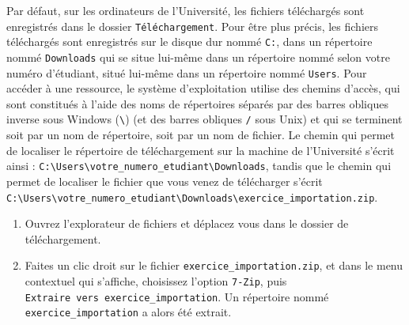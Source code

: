 \documentclass[
  11pt,
]{book}
\providecommand{\tightlist}{%
  \setlength{\itemsep}{0pt}\setlength{\parskip}{0pt}}
\numberwithin{equation}{section}
\numberwithin{countremarque}{section}
\newenvironment{greenbox}{
  \begin{tcolorbox}[breakable, colback=vert,coltext=black,
                  colframe=grisfonce]}
 {\end{tcolorbox}}
\begin{document}
Par défaut, sur les ordinateurs de l'Université, les fichiers téléchargés sont enregistrés dans le dossier \texttt{Téléchargement}. Pour être plus précis, les fichiers téléchargés sont enregistrés sur le disque dur nommé \texttt{C:}, dans un répertoire nommé \texttt{Downloads} qui se situe lui-même dans un répertoire nommé selon votre numéro d'étudiant, situé lui-même dans un répertoire nommé \texttt{Users}. Pour accéder à une ressource, le système d'exploitation utilise des chemins d'accès, qui sont constitués à l'aide des noms de répertoires séparés par des barres obliques inverse sous Windows (\texttt{\textbackslash{}}) (et des barres obliques \texttt{/} sous Unix) et qui se terminent soit par un nom de répertoire, soit par un nom de fichier. Le chemin qui permet de localiser le répertoire de téléchargement sur la machine de l'Université s'écrit ainsi : \texttt{C:\textbackslash{}Users\textbackslash{}votre\_numero\_etudiant\textbackslash{}Downloads}, tandis que le chemin qui permet de localiser le fichier que vous venez de télécharger s'écrit \texttt{C:\textbackslash{}Users\textbackslash{}votre\_numero\_etudiant\textbackslash{}Downloads\textbackslash{}exercice\_importation.zip}.

\begin{greenbox}

\begin{enumerate}
\def\labelenumi{\arabic{enumi}.}
\setcounter{enumi}{1}
\tightlist
\item
  Ouvrez l'explorateur de fichiers et déplacez vous dans le dossier de téléchargement.
\item
  Faites un clic droit sur le fichier \texttt{exercice\_importation.zip}, et dans le menu contextuel qui s'affiche, choisissez l'option \texttt{7-Zip}, puis \texttt{Extraire\ vers\ exercice\_importation}. Un répertoire nommé \texttt{exercice\_importation} a alors été extrait.
\end{enumerate}

\end{greenbox}
\end{document}
